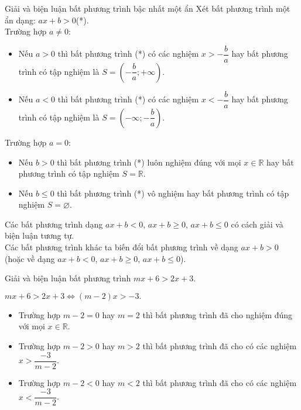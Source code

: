 \begin{dang}{Giải và biện luận bất phương trình bậc nhất một ẩn}
	Xét bất phương trình một ẩn dạng: $ax + b > 0$\hfill (*).\\
	 Trường hợp $a \neq 0$:
	\begin{itemize}
		\item Nếu $a > 0$ thì bất phương trình (*) có các nghiệm $x > -\dfrac{b}{a}$ hay bất phương trình có tập nghiệm là $S = \left( -\dfrac{b}{a}; +\infty \right)$.
		\item Nếu $a < 0$ thì bất phương trình (*) có các nghiệm $x < -\dfrac{b}{a}$ hay bất phương trình có tập nghiệm là $S = \left( -\infty; -\dfrac{b}{a} \right)$.
	\end{itemize}
	 Trường hợp $a = 0$:
	\begin{itemize}
		\item Nếu $b > 0$ thì bất phương trình (*) luôn nghiệm đúng với mọi $x \in\mathbb{R}$ hay bất phương trình có tập nghiệm $S=\mathbb{R}$.
		\item Nếu $b \leq 0$ thì bất phương trình (*) vô nghiệm hay bất phương trình có tập nghiệm $S=\varnothing$.
	\end{itemize}
	Các bất phương trình dạng $ax + b < 0$, $ax + b \ge 0$, $ax + b \le 0$ có cách giải và biện luận tương tự.\\
	Các bất phương trình khác ta biến đổi bất phương trình về dạng $ax + b > 0$ (hoặc về dạng $ax + b < 0$, $ax + b \ge 0$, $ax + b \le 0$).
\end{dang}


\setcounter{vd}{0}
\begin{vd}%
	Giải và biện luận bất phương trình $mx+6>2x+3$.
	\loigiai
	{
		$mx+6>2x+3 \Leftrightarrow (m-2)x > -3.$
		\begin{itemize}
			\item Trường hợp $m-2 = 0$ hay $m=2$ thì bất phương trình đã cho nghiệm đúng với mọi $x \in \mathbb{R}$.
			\item Trường hợp $m-2 >0$ hay $m > 2$ thì bất phương trình đã cho có các nghiệm $x > \dfrac{-3}{m-2}$.
			\item Trường hợp $m-2 <0$ hay $m < 2$ thì bất phương trình đã cho có các nghiệm $x < \dfrac{-3}{m-2}$.
		\end{itemize}
	}
\end{vd}

